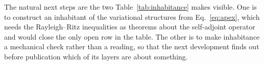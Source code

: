\documentclass[aps,prd,reprint,nofootinbib,superscriptaddress]{revtex4-2}
\begin{document}
The natural next steps are the two Table~\ref{tab:inhabitance} makes visible. One is to construct an
inhabitant of the variational structures from Eq.~\eqref{eq:apex}, which needs the Rayleigh--Ritz
inequalities as theorems about the self-adjoint operator and would close the only open row in the
table. The other is to make inhabitance a mechanical check rather than a reading, so that the next
development finds out before publication which of its layers are about something.



\end{document}
